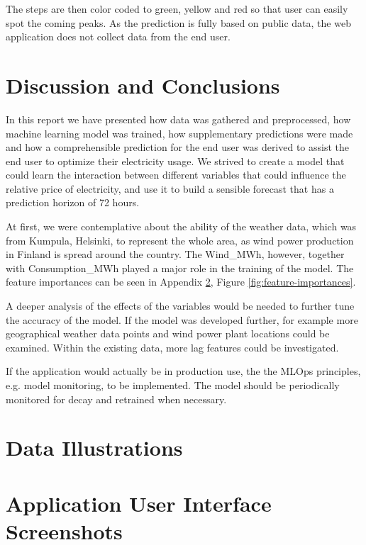 \documentclass{article}
\begin{document}
The steps are then color coded to green, yellow and red so that user can easily spot the coming peaks. As the prediction is fully based on public data, the web application does not collect data from the end user.

\section{Discussion and Conclusions}
\label{section:conclusions}

In this report we have presented how data was gathered and preprocessed, how machine learning model was trained, how supplementary predictions were made and how a comprehensible prediction for the end user was derived to assist the end user to optimize their electricity usage. We strived to create a model that could learn the interaction between different variables that could influence the relative price of electricity, and use it to build a sensible forecast that has a prediction horizon of 72 hours.

At first, we were contemplative about the ability of the weather data, which was from Kumpula, Helsinki, to represent the whole area, as wind power production in Finland is spread around the country. The Wind\_MWh, however, together with Consumption\_MWh played a major role in the training of the model. The feature importances can be seen in Appendix \ref{section:appendixa}, Figure \ref{fig:feature-importances}. 

A deeper analysis of the effects of the variables would be needed to further tune the accuracy of the model. If the model was developed further, for example more geographical weather data points and wind power plant locations could be examined. Within the existing data, more lag features could be investigated.

If the application would actually be in production use, the the MLOps principles, e.g. model monitoring, to be implemented. The model should be periodically monitored for decay and retrained when necessary.



\appendix
\section{Data Illustrations}

\label{section:appendixa}

\section{Application User Interface Screenshots}

\label{section:appendixb}
\end{document}
